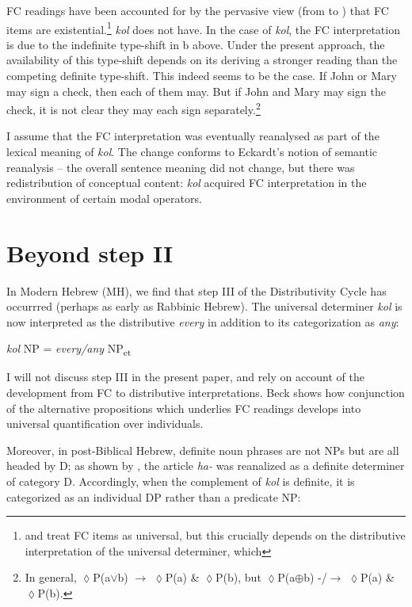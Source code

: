 \documentclass[output=paper]{langsci/langscibook}
\begin{document}
FC readings have been accounted for by the pervasive view (from \citealt{KadmonLandman1993} to \citealt{Chierchia2013}) that FC items are existential.\footnote{\citet{Benito2010} and \citet{Zimmermann2008} treat FC items as universal, but this crucially depends on the distributive interpretation of the universal determiner, which} \textrm{\textit{kol}} \textrm{does not have.} In the case of \textit{kol}, the FC interpretation is due to the indefinite type-shift in b above. Under the present approach, the availability of this type-shift depends on its deriving a stronger reading than the competing definite type-shift. This indeed seems to be the case. If John or Mary may sign a check, then each of them may. But if John and Mary may sign the check, it is not clear they may each sign separately.\footnote{ \textrm{In general, ${\lozenge}$P(a${\vee}$b) ${\rightarrow}$  ${\lozenge}$P(a) \& ${\lozenge}$P(b), but  ${\lozenge}$P(a${\oplus}$}b) -/\textrm{${\rightarrow}$} ${\lozenge}$P(a) \& ${\lozenge}$P(b).}

I assume that the FC interpretation was eventually reanalysed as part of the lexical meaning of \textit{kol}. The change conforms to Eckardt's \citeyearpar[236]{Eckardt2006} notion of semantic reanalysis – the overall sentence meaning did not change, but there was redistribution of conceptual content: \textit{kol} acquired FC interpretation in the environment of certain modal operators.

\section{Beyond step II}\label{sec:doron:6}%

In Modern Hebrew (MH), we find that step III of the Distributivity Cycle has occurrred (perhaps as early as Rabbinic Hebrew). The universal determiner \textit{kol} is now interpreted as the distributive \textit{every} in addition to its categorization as \textit{any}:

\ea%
    \label{ex:doron:56}
    \textit{kol} NP  =  \textit{every/any}   NP\textsubscript{et}
\z

I will not discuss step III in the present paper, and rely on  account of the development from FC to distributive interpretations. Beck shows how conjunction of the alternative propositions which underlies FC readings develops into universal quantification over individuals.

Moreover, in post-Biblical Hebrew, definite noun phrases are not NPs but are all headed by D; as shown by \citet{DoronMeir2016}, the article \textit{ha-} was reanalized as a definite determiner of category D. Accordingly, when the complement of \textit{kol} is definite, it is categorized as an individual DP rather than a predicate NP:
\end{document}
